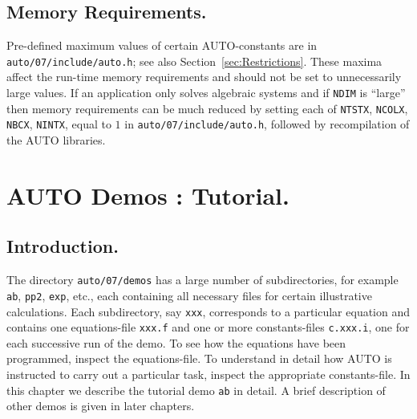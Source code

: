 \documentclass[12pt]{report}
\begin{document}
\section{ Memory Requirements.} \label{sec:Memory_requirements}
Pre-defined maximum values of certain {\cal AUTO}-constants
are in {\tt auto/07/include/auto.h}; 
see also Section~\ref{sec:Restrictions}. 
These maxima affect the run-time memory requirements
and should not be set to unnecessarily large values.
If an application only solves algebraic systems and if {\tt NDIM} is ``large''
then memory requirements can be much reduced by setting each of
{\tt NTSTX}, {\tt NCOLX}, {\tt NBCX}, {\tt NINTX}, 
equal to $1$ in {\tt auto/07/include/auto.h},
followed by recompilation of the {\cal AUTO} libraries.



\chapter{ {\cal AUTO} Demos : Tutorial.} \label{ch:Demos:_Tutorial}
\newpage
\section{ Introduction.} \label{sec:Tutorial_Introduction}
The directory {\tt auto/07/demos} has a large number of subdirectories,
for example {\tt ab}, {\tt pp2}, {\tt exp}, etc.,
each containing all necessary files for certain illustrative calculations.
Each subdirectory, say {\tt xxx}, corresponds to a particular equation
and contains one equations-file {\tt xxx.f}
and one or more constants-files {\tt c.xxx.i}, 
one for each successive run of the demo.
To see how the equations have been programmed, inspect the equations-file. 
To understand in detail how {\cal AUTO} is instructed to carry out a 
particular task, inspect the appropriate constants-file.
In this chapter we describe the tutorial demo {\tt ab} in detail.
A brief description of other demos is given in later chapters.
\end{document}

